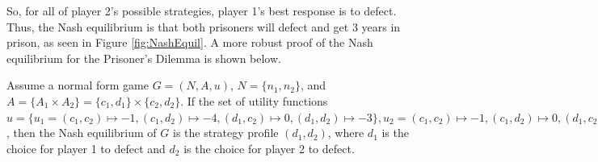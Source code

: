 So, for all of player 2's possible strategies, player 1's best response is to defect. Thus, the Nash equilibrium is that both prisoners will defect and get 3 years in prison, as seen in Figure \ref{fig:NashEquil}. A more robust proof of the Nash equilibrium for the Prisoner's Dilemma is shown below.



\begin{thm}
  Assume a normal form game $G = (N, A, u)$, $N=\{n_1, n_2\}$, and $A=\{A_1\times A_2\} = \{c_1, d_1\}\times\{c_2, d_2\}$. If the set of utility functions $u = \{u_1=(c_1, c_2)\mapsto -1, (c_1, d_2)\mapsto -4, (d_1, c_2)\mapsto 0, (d_1, d_2)\mapsto -3\}, u_2=(c_1, c_2)\mapsto -1, (c_1, d_2)\mapsto 0, (d_1, c_2)\mapsto -4, (d_1, d_2)\mapsto -3$, then the Nash equilibrium of $G$ is the strategy profile $(d_1, d_2)$, where $d_1$ is the choice for player 1 to defect and $d_2$ is the choice for player 2 to defect.
\end{thm}
